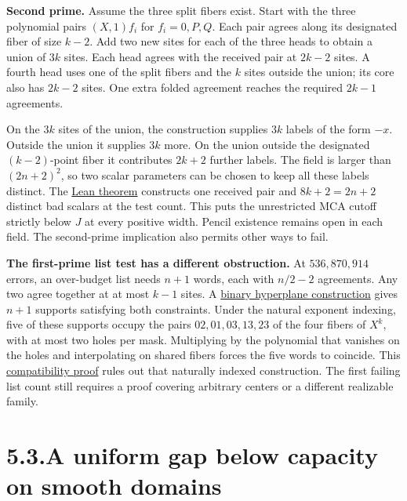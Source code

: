 \documentclass[11pt,letterpaper]{article}
\begin{document}
\textbf{Second prime.} Assume the three split fibers exist. Start with the three
polynomial pairs $(X,1)f_i$ for $f_i=0,P,Q$. Each pair agrees along its designated
fiber of size $k-2$. Add two new sites for each of the three heads to obtain a union
of $3k$ sites. Each head agrees with the received pair at $2k-2$ sites. A fourth
head uses one of the split fibers and the $k$ sites outside the union; its core also
has $2k-2$ sites. One extra folded agreement reaches the required $2k-1$ agreements.

On the $3k$ sites of the union, the construction supplies $3k$ labels of the form
$-x$. Outside the union it supplies $3k$ more. On the union outside the designated
$(k-2)$-point fiber it contributes $2k+2$ further labels. The field is larger than
$(2n+2)^2$, so two scalar parameters can be chosen to keep all these labels distinct.
The \href{https://github.com/SlopDotCash/proximityprize/blob/ed1430b2385f4773356b8b84360343da09d9ef38/ArkLib/Research/ProximityGap/Frontier/SecondPrimeTransversePencil.lean}{Lean theorem}
constructs one received pair and $8k+2=2n+2$ distinct bad scalars at the test count.
This puts the unrestricted MCA cutoff strictly below $J$ at every positive width.
Pencil existence remains open in each field. The second-prime implication also permits
other ways to fail.

\textbf{The first-prime list test has a different obstruction.}
At $536{,}870{,}914$ errors, an over-budget list needs $n+1$ words, each with $n/2-2$
agreements. Any two agree together at at most $k-1$ sites. A
\href{https://github.com/SlopDotCash/proximityprize/blob/e2af44d81a5cf8c7fbd33b6f5ad0a60bb2d414cc/ArkLib/Research/ProximityGap/Frontier/QuarterSupportPackingBarrier.lean}{binary hyperplane construction}
gives $n+1$ supports satisfying both constraints. Under the natural exponent indexing,
five of these supports occupy the pairs $02,01,03,13,23$ of the four fibers of $X^k$,
with at most two holes per mask. Multiplying by the polynomial that vanishes on the
holes and interpolating on shared fibers forces the five words to coincide. This
\href{https://github.com/SlopDotCash/proximityprize/blob/ed1430b2385f4773356b8b84360343da09d9ef38/ArkLib/Research/ProximityGap/Frontier/FiveHeadFiberRigidity.lean}{compatibility proof}
rules out that naturally indexed construction. The first failing list count still
requires a proof covering arbitrary centers or a different realizable family.

\newpage
\section*{5.3.\quad A uniform gap below capacity on smooth domains}
\end{document}
